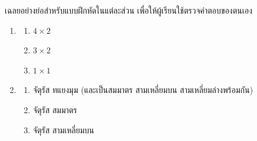 \clearpage
\answerkeyhead
เฉลยอย่างย่อสำหรับแบบฝึกหัดในแต่ละส่วน เพื่อให้ผู้เรียนใช้ตรวจคำตอบของตนเอง

\begin{enumerate}[label={},leftmargin=0pt]
    \item
    \begin{enumerate}[label=\textbf{\thechapter.\arabic{enumi}.\arabic*}]
        \item $4\times 2$
        \item $3\times 2$
        \item $1\times 1$
    \end{enumerate}

    \item
    \begin{enumerate}[label=\textbf{\thechapter.\arabic{enumi}.\arabic*}]
        \item จัตุรัส ทแยงมุม (และเป็นสมมาตร สามเหลี่ยมบน สามเหลี่ยมล่างพร้อมกัน)
        \item จัตุรัส สมมาตร
        \item จัตุรัส สามเหลี่ยมบน
    \end{enumerate}
\end{enumerate}

